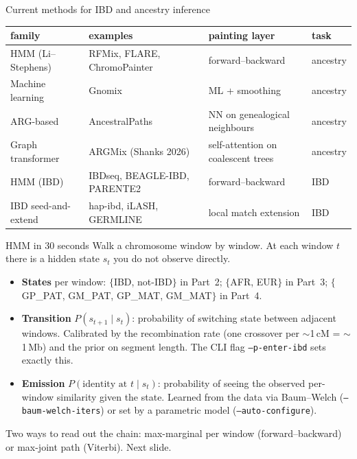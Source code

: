 \documentclass[10pt,aspectratio=169]{beamer}
\begin{document}
\begin{frame}{Current methods for IBD and ancestry inference}
  \vspace{0.5em}
  \centering
  \footnotesize
  \begin{tabular}{@{}llll@{}}
    \toprule
    \textbf{family} & \textbf{examples} & \textbf{painting layer} & \textbf{task} \\
    \midrule
    HMM (Li--Stephens) & RFMix, FLARE, ChromoPainter & forward--backward & ancestry \\
    Machine learning & Gnomix & ML + smoothing & ancestry \\
    ARG-based & AncestralPaths & NN on genealogical neighbours & ancestry \\
    Graph transformer & ARGMix (Shanks 2026) & self-attention on coalescent trees & ancestry \\
    HMM (IBD) & IBDseq, BEAGLE-IBD, PARENTE2 & forward--backward & IBD \\
    IBD seed-and-extend & hap-ibd, iLASH, GERMLINE & local match extension & IBD \\
    \bottomrule
  \end{tabular}
\end{frame}

\begin{frame}{HMM in 30 seconds}
  \vspace{0.4em}
  \footnotesize
  Walk a chromosome window by window. At each window $t$ there is a
  \alert{hidden state} $s_t$ you do not observe directly.
  \vspace{0.6em}
  \begin{itemize}\setlength{\itemsep}{0.45em}
    \item \textbf{States} per window: $\{$IBD, not-IBD$\}$ in Part~2;
      $\{$AFR, EUR$\}$ in Part~3; $\{$GP\_PAT, GM\_PAT, GP\_MAT, GM\_MAT$\}$
      in Part~4.
    \item \textbf{Transition} $P(s_{t+1}\!\mid\!s_t)$: probability of
      switching state between adjacent windows. Calibrated by the
      recombination rate (one crossover per $\sim$1\,cM = $\sim$1\,Mb)
      and the prior on segment length. The CLI flag
      \texttt{--p-enter-ibd} sets exactly this.
    \item \textbf{Emission} $P(\text{identity at }t\!\mid\!s_t)$:
      probability of seeing the observed per-window similarity given
      the state. Learned from the data via Baum--Welch
      (\texttt{--baum-welch-iters}) or set by a parametric model
      (\texttt{--auto-configure}).
  \end{itemize}
  \vspace{0.4em}
  \centering
  \footnotesize
  \alert{Two ways to read out the chain:} max-marginal per window
  (forward--backward) or max-joint path (Viterbi). Next slide.
\end{frame}
\end{document}
